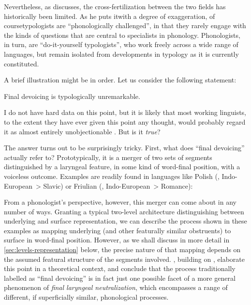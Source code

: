 \documentclass[output=paper,colorlinks,citecolor=brown]{langscibook}
\begin{document}
Nevertheless, as \textcite{plank2018} discusses, the cross\hyp fertilization between the two fields has historically been limited. As he puts it\dash with a degree of exaggeration, of course\dash typologists are \enquote{phonologically challenged}, in that they rarely engage with the kinds of questions that are central to specialists in phonology. Phonologists, in turn, are \enquote{do\hyp it\hyp yourself typologists}, who work freely across a wide range of languages, but remain isolated from developments in typology as it is currently constituted.

A brief illustration might be in order. Let us consider the following statement:

\begin{exe}
\ex Final devoicing is typologically unremarkable.
\end{exe}

I do not have hard data on this point, but it is likely that most working linguists, to the extent they have ever given this point any thought, would probably regard it as almost entirely unobjectionable \parencite[94]{blevins}. But is it \emph{true}?

The answer turns out to be surprisingly tricky. First, what does \enquote{final devoicing} actually refer to? Prototypically, it is a merger of two sets of segments distinguished by a laryngeal feature, in some kind of word\hyp final position, with a voiceless outcome. Examples are readily found in languages like Polish (, Indo-European~> Slavic) or Friulian (, Indo\hyp European~> Romance):

\begin{exe}
      \ex{}
      \ex{}
      \ex{}
      \ex{}
\end{exe}

From a phonologist's perspective, however, this merger can come about in any number of ways. Granting a typical two\hyp level architecture distinguishing between underlying and surface representation, we can describe the process shown in these examples as mapping underlying  (and other featurally similar obstruents) to surface \ipa{[t]} in word\hyp final position. However, as we shall discuss in more detail in \cref{sec:levels-representation} below, the precise nature of that mapping depends on the assumed featural structure of the segments involved. \textcite{iverson11:_final}, building on \textcite{vaux05}, elaborate this point in a theoretical context, and conclude that the process traditionally labelled as \enquote{final devoicing} is in fact just one possible facet of a more general phenomenon of \emph{final laryngeal neutralization}, which encompasses a range of different, if superficially similar, phonological processes.
\end{document}
